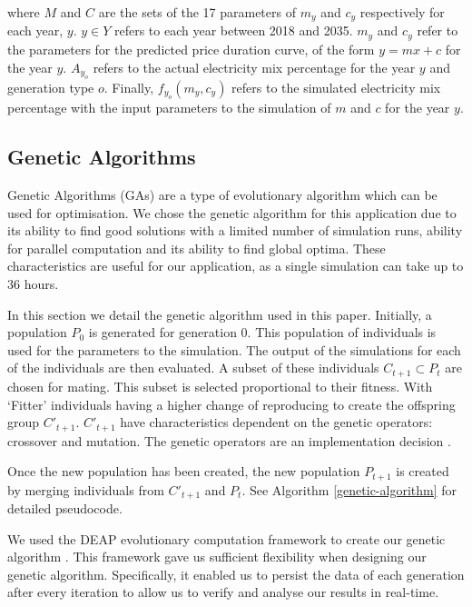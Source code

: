 \noindent where $M$ and $C$ are the sets of the 17 parameters of $m_y$ and $c_y$ respectively for each year, $y$. $y\in Y$ refers to each year between 2018 and 2035. $m_y$ and $c_y$ refer to the parameters for the predicted price duration curve, of the form $y=mx+c$ for the year $y$. $A_{y_o}$ refers to the actual electricity mix percentage for the year $y$ and generation type $o$. Finally, $f_{y_o}(m_y,c_y)$ refers to the simulated electricity mix percentage with the input parameters to the simulation of $m$ and $c$ for the year $y$.












\subsection{Genetic Algorithms}

Genetic Algorithms (GAs) are a type of evolutionary algorithm which can be used for optimisation. We chose the genetic algorithm for this application due to its ability to find good solutions with a limited number of simulation runs, ability for parallel computation and its ability to find global optima. These characteristics are useful for our application, as a single simulation can take up to 36 hours. 

In this section we detail the genetic algorithm used in this paper. Initially, a population $P_{0}$ is generated for generation 0. This population of individuals is used for the parameters to the simulation. The output of the simulations for each of the individuals are then evaluated. A subset of these individuals $C_{t+1} \subset P_{t}$ are chosen for mating. This subset is selected proportional to their fitness. With `Fitter' individuals having a higher change of reproducing to create the offspring group $C'_{t+1}$. $C'_{t+1}$ have characteristics dependent on the genetic operators: crossover and mutation. The genetic operators are an implementation decision \cite{FogelDavidB2009}. 

Once the new population has been created, the new population $P_{t+1}$ is created by merging individuals from $C'_{t+1}$ and $P_{t}$. See Algorithm \ref{genetic-algorithm} for detailed pseudocode.

We used the DEAP evolutionary computation framework to create our genetic algorithm \cite{Gagn2012}. This framework gave us sufficient flexibility when designing our genetic algorithm. Specifically, it enabled us to persist the data of each generation after every iteration to allow us to verify and analyse our results in real-time.

